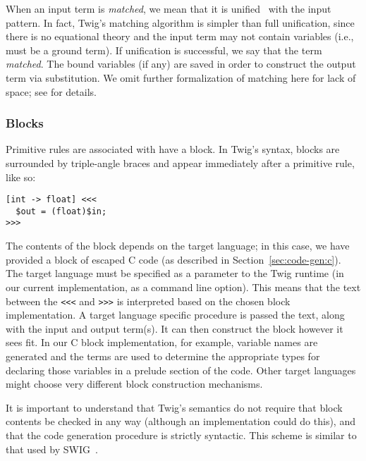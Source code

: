 When an input term is \emph{matched}, we mean that it is
unified~\cite{baader98rewriting} with the input pattern. In fact,
Twig's matching algorithm is simpler than full unification, since
there is no equational theory and the input term may not contain
variables (i.e., must be a ground term). If unification is
successful, we say that the term \emph{matched}. The bound
variables (if any) are saved in order to construct the output term
via substitution. We omit further formalization of matching here
for lack of space; see \cite{baader98rewriting,system-s} for
details.


\subsubsection{Blocks}

Primitive rules are associated with have a block. In Twig's syntax, blocks are surrounded by triple-angle braces and appear immediately after a primitive rule, like so:

\begin{verbatim}
[int -> float] <<<
  $out = (float)$in;
>>>
\end{verbatim}

The contents of the block depends on the target language; in this case, we have provided a block of escaped C code (as described in Section~\ref{sec:code-gen:c}). The target language must be specified as a parameter to the Twig runtime (in our current implementation, as a command line option). This means that the text between the \verb|<<<| and \verb|>>>| is interpreted based on the chosen block implementation. A target language specific procedure is passed the text, along with the input and output term(s). It can then construct the block however it sees fit. In our C block implementation, for example, variable names are generated and the terms are used to determine the appropriate types for declaring those variables in a prelude section of the code. Other target languages might choose very different block construction mechanisms.

It is important to understand that Twig's semantics do not require that block contents be checked in any way (although an implementation could do this), and that the code generation procedure is strictly syntactic. This scheme is similar to that used by SWIG~\cite{swig}.
